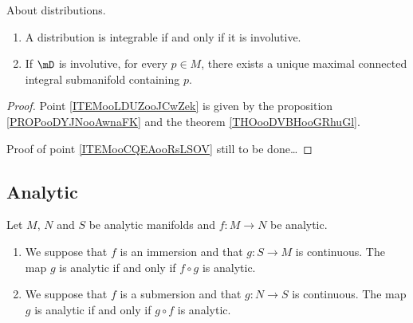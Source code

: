 \begin{theorem}      \label{THOooVRDYooIusxwW}
	About distributions.
	\begin{enumerate}
		\item       \label{ITEMooLDUZooJCwZek}
		      A distribution is integrable if and only if it is involutive.
		\item       \label{ITEMooCQEAooRsLSOV}
		      If \( \mD\) is involutive, for every \( p\in M\), there exists a unique maximal connected integral submanifold containing \( p\).
	\end{enumerate}
\end{theorem}

\begin{proof}
	Point \ref{ITEMooLDUZooJCwZek} is given by the proposition \ref{PROPooDYJNooAwnaFK} and the theorem \ref{THOooDVBHooGRhuGl}.

	Proof of point \ref{ITEMooCQEAooRsLSOV} still to be done\ldots
\end{proof}

\subsection{Analytic}

\begin{proposition}       \label{PROPooKAXOooZCwcwi}
	Let \( M\), \( N\) and \( S\) be analytic manifolds and \( f\colon M\to N\) be analytic.
	\begin{enumerate}
		\item
		      We suppose that \( f\) is an immersion and that \( g\colon S\to M\) is continuous. The map \( g\) is analytic if and only if \( f\circ g\) is analytic.
		\item
		      We suppose that \( f\) is a submersion and that \( g\colon N\to S\) is continuous. The map \( g\) is analytic if and only if \( g\circ f\) is analytic.
	\end{enumerate}
\end{proposition}


